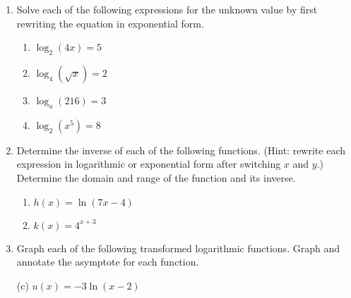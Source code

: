   
\begin{enumerate}
\item Solve each of the following expressions for the unknown value by
  first rewriting the equation in exponential form.
  \begin{enumerate}
  \item $\displaystyle \log_2(4x)=5$
  \item $\displaystyle \log_4\left(\sqrt{x}\right)=2$
  \item $\displaystyle \log_{a}(216)=3$
  \item $\displaystyle \log_2\left(x^5\right)=8$
  \end{enumerate}

\item Determine the inverse of each of the following functions.
  (Hint: rewrite each expression in logarithmic or exponential form
  after switching $x$ and $y$.)  Determine the domain and range of the
  function and its inverse.
  \begin{enumerate}
  \item $h(x)=\ln(7x-4)$ 
  \item $\displaystyle k(x)=4^{x+3}$ 
  \end{enumerate}

\item Graph each of the following transformed logarithmic
  functions. Graph and annotate the asymptote for each function.
\item[(c)] $u(x)=-3\ln(x-2)$

\end{enumerate}

